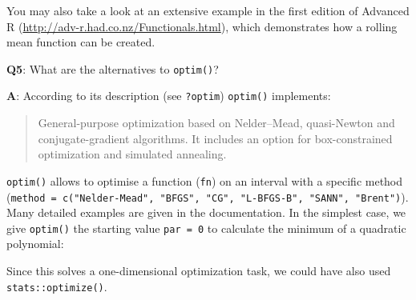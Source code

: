 \documentclass[
]{krantz}
\makeatletter
\newenvironment{Shaded}{\begin{snugshade}}{\end{snugshade}}
\newcommand{\CommentTok}[1]{\textcolor[rgb]{0.56,0.35,0.01}{\textit{#1}}}
\newcommand{\ControlFlowTok}[1]{\textcolor[rgb]{0.13,0.29,0.53}{\textbf{#1}}}
\newcommand{\DataTypeTok}[1]{\textcolor[rgb]{0.13,0.29,0.53}{#1}}
\newcommand{\DecValTok}[1]{\textcolor[rgb]{0.00,0.00,0.81}{#1}}
\newcommand{\FloatTok}[1]{\textcolor[rgb]{0.00,0.00,0.81}{#1}}
\newcommand{\KeywordTok}[1]{\textcolor[rgb]{0.13,0.29,0.53}{\textbf{#1}}}
\newcommand{\NormalTok}[1]{#1}
\newcommand{\OperatorTok}[1]{\textcolor[rgb]{0.81,0.36,0.00}{\textbf{#1}}}
\newcommand{\StringTok}[1]{\textcolor[rgb]{0.31,0.60,0.02}{#1}}
\renewcommand{\href}[2]{#2 (\url{#1})}
\newenvironment{kframe}{%
\medskip{}
\setlength{\fboxsep}{.8em}
 \def\at@end@of@kframe{}%
 \ifinner\ifhmode%
  \def\at@end@of@kframe{\end{minipage}}%
  \begin{minipage}{\columnwidth}%
 \fi\fi%
 \def\FrameCommand##1{\hskip\@totalleftmargin \hskip-\fboxsep
 \colorbox{shadecolor}{##1}\hskip-\fboxsep
     \hskip-\linewidth \hskip-\@totalleftmargin \hskip\columnwidth}%
 \MakeFramed {\advance\hsize-\width
   \@totalleftmargin\z@ \linewidth\hsize
   \@setminipage}}%
 {\par\unskip\endMakeFramed%
 \at@end@of@kframe}
\renewenvironment{Shaded}{\begin{kframe}}{\end{kframe}}
\renewcommand{\KeywordTok} [1]{\textcolor[rgb]{0.00,0.44,0.13}{{#1}}}
\renewcommand{\DataTypeTok}[1]{\textcolor[rgb]{0.56,0.13,0.00}{{#1}}}
\renewcommand{\DecValTok}  [1]{\textcolor[rgb]{0.25,0.63,0.44}{{#1}}}
\renewcommand{\FloatTok}   [1]{\textcolor[rgb]{0.25,0.63,0.44}{{#1}}}
\renewcommand{\StringTok}  [1]{\textcolor[rgb]{0.25,0.44,0.63}{{#1}}}
\renewcommand{\CommentTok} [1]{\textcolor[rgb]{0.38,0.63,0.69}{{#1}}}
\renewcommand{\NormalTok}  [1]{{#1}}
\makeatother
\begin{document}
You may also take a look at an extensive example in the \href{http://adv-r.had.co.nz/Functionals.html}{first edition of Advanced R}, which demonstrates how a rolling mean function can be created.

\textbf{{Q5}}: What are the alternatives to \texttt{optim()}?

\textbf{{A}}: According to its description (see \texttt{?optim}) \texttt{optim()} implements:

\begin{quote}
General-purpose optimization based on Nelder--Mead, quasi-Newton and conjugate-gradient algorithms. It includes an option for box-constrained optimization and simulated annealing.
\end{quote}

\texttt{optim()} allows to optimise a function (\texttt{fn}) on an interval with a specific method (\texttt{method\ =\ c("Nelder-Mead",\ "BFGS",\ "CG",\ "L-BFGS-B",\ "SANN",\ "Brent")}). Many detailed examples are given in the documentation. In the simplest case, we give \texttt{optim()} the starting value \texttt{par\ =\ 0} to calculate the minimum of a quadratic polynomial:

\begin{Shaded}
\end{Shaded}

Since this solves a one-dimensional optimization task, we could have also used \texttt{stats::optimize()}.

\begin{Shaded}
\end{Shaded}
\end{document}
